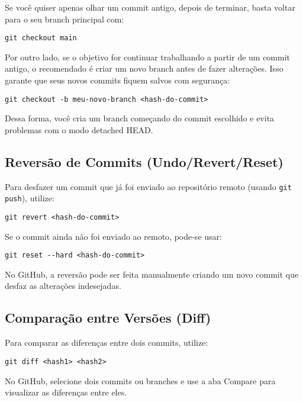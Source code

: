 Se você quiser apenas olhar um commit antigo, depois de terminar, basta voltar para o seu branch principal com:

\begin{lstlisting}[style=shellstyle]
git checkout main
\end{lstlisting}

Por outro lado, se o objetivo for continuar trabalhando a partir de um commit antigo, o recomendado é criar um novo branch antes de fazer alterações. Isso garante que seus novos commits fiquem salvos com segurança:

\begin{lstlisting}[style=shellstyle]
git checkout -b meu-novo-branch <hash-do-commit>
\end{lstlisting}

Dessa forma, você cria um branch começando do commit escolhido e evita problemas com o modo detached HEAD.  

\subsection{Reversão de Commits (Undo/Revert/Reset)}

Para desfazer um commit que já foi enviado ao repositório remoto (usando \texttt{git push}), utilize:

\begin{lstlisting}[style=shellstyle]
git revert <hash-do-commit>
\end{lstlisting}

Se o commit ainda não foi enviado ao remoto, pode-se usar:

\begin{lstlisting}[style=shellstyle]
git reset --hard <hash-do-commit>
\end{lstlisting}

No GitHub, a reversão pode ser feita manualmente criando um novo commit que desfaz as alterações indesejadas.

\subsection{Comparação entre Versões (Diff)}

Para comparar as diferenças entre dois commits, utilize:

\begin{lstlisting}[style=shellstyle]
git diff <hash1> <hash2>
\end{lstlisting}

No GitHub, selecione dois commits ou branches e use a aba Compare para visualizar as diferenças entre eles.

